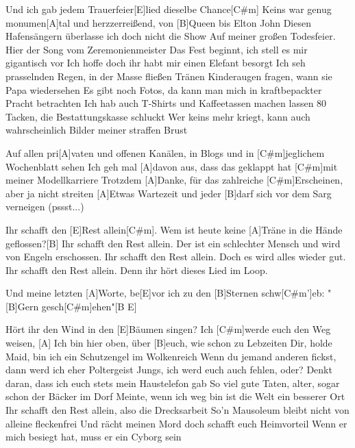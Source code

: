



\begin{guitar}
	Und ich gab jedem Trauerfeier[E]lied dieselbe Chance[C#m]{}
	Keins war genug monumen[A]tal und herzzerreißend, von [B]Queen bis Elton John
	Diesen Hafensängern überlasse ich doch nicht die Show
	Auf meiner großen Todesfeier. Hier der Song vom Zeremonienmeister
	Das Fest beginnt, ich stell es mir gigantisch vor
	Ich hoffe doch ihr habt mir einen Elefant besorgt
	Ich seh prasselnden Regen, in der Masse fließen Tränen
	Kinderaugen fragen, wann sie Papa wiedersehen
	Es gibt noch Fotos, da kann man mich in kraftbepackter Pracht betrachten
	Ich hab auch T-Shirts und Kaffeetassen machen lassen
	80 Tacken, die Bestattungskasse schluckt
	Wer keins mehr kriegt, kann auch wahrscheinlich Bilder meiner straffen Brust
	
	Auf allen pri[A]vaten und offenen Kanälen, in Blogs und in [C#m]jeglichem Wochenblatt sehen\vspace*{-0.25em}
	Ich geh mal [A]davon aus, dass das geklappt hat [C#m]mit meiner Modellkarriere
	Trotzdem [A]Danke, für das zahlreiche [C#m]Erscheinen, aber ja nicht streiten
	[A]Etwas Wartezeit und jeder [B]darf sich vor dem Sarg verneigen (pssst...)
	
	\begin{highlightbar}
		Ihr schafft den [E]Rest allein[C#m].
		Wem ist heute keine [A]Träne in die Hände geflossen?[B]{}
		Ihr schafft den Rest allein.
		Der ist ein schlechter Mensch und wird von Engeln erschossen.
		Ihr schafft den Rest allein.
		Doch es wird alles wieder gut.
		Ihr schafft den Rest allein.
		Denn ihr hört dieses Lied im Loop.
	\end{highlightbar}
	
	Und meine letzten [A]Worte, be[E]vor ich zu den [B]Sternen schw[C#m']eb:
	"[B]Gern gesch[C#m]ehen"[B E]{}
	
	Hört ihr den Wind in den [E]Bäumen singen? Ich [C#m]werde euch den Weg weisen, 
	[A] Ich bin hier oben, über [B]euch, wie schon zu Lebzeiten
	Dir, holde Maid, bin ich ein Schutzengel im Wolkenreich
	Wenn du jemand anderen fickst, dann werd ich eher Poltergeist
	Jungs, ich werd euch auch fehlen, oder?
	Denkt daran, dass ich euch stets mein Haustelefon gab
	So viel gute Taten, alter, sogar schon der Bäcker im Dorf
	Meinte, wenn ich weg bin ist die Welt ein besserer Ort
	Ihr schafft den Rest allein, also die Drecksarbeit
	So'n Mausoleum bleibt nicht von alleine fleckenfrei
	Und rächt meinen Mord doch schafft euch Heimvorteil
	Wenn er mich besiegt hat, muss er ein Cyborg sein
	

\end{guitar}
